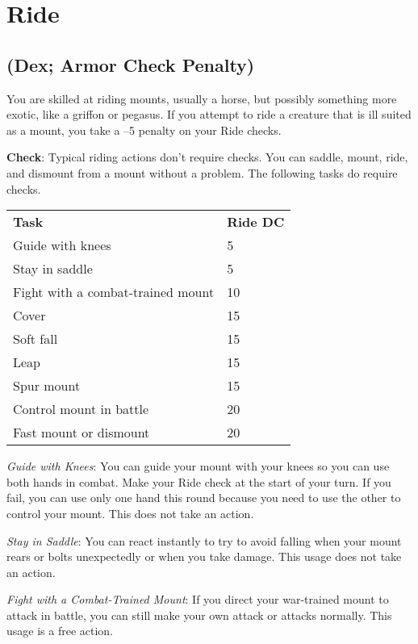 \section{Ride}

\label{f0}
\subsection{(Dex; Armor Check Penalty)}

				
You are skilled at riding mounts, usually a horse, but possibly something more exotic, like a griffon or pegasus. If you attempt to ride a creature that is ill suited as a mount, you take a --5 penalty on your Ride checks.
				
\textbf{Check}: Typical riding actions don't require checks. You can saddle, mount, ride, and dismount from a mount without a problem. The following tasks do require checks.
\begin{table}
\sffamily
 \begin{tabular}{ll}
\textbf{Task} & \textbf{Ride DC}\\
Guide with knees & 5\\
Stay in saddle & 5\\
Fight with a combat-trained mount & 10\\
Cover & 15\\
Soft fall & 15\\
Leap & 15\\
Spur mount&15\\
Control mount in battle&20\\
Fast mount or dismount&20\\
 \end{tabular}

\end{table}


				
\textit{Guide with Knees}: You can guide your mount with your knees so you can use both hands in combat. Make your Ride check at the start of your turn. If you fail, you can use only one hand this round because you need to use the other to control your mount. This does not take an action.
				
\textit{Stay in Saddle}: You can react instantly to try to avoid falling when your mount rears or bolts unexpectedly or when you take damage. This usage does not take an action.
				
\textit{Fight with a Combat-Trained Mount}: If you direct your war-trained mount to attack in battle, you can still make your own attack or attacks normally. This usage is a free action.
				
